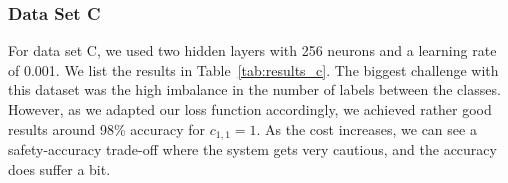 \documentclass[acmsmall,nonacm]{acmart}
\begin{document}
\subsubsection*{Data Set C}
For data set C, we used two hidden layers with 256 neurons and a learning rate of 0.001. We list the results in Table~\ref{tab:results_c}. The biggest challenge with this dataset was the high imbalance in the number of labels between the classes. However, as we adapted our loss function accordingly, we achieved rather good results around 98\% accuracy for $c_{1, 1} = 1$. As the cost increases, we can see a safety-accuracy trade-off where the system gets very cautious, and the accuracy does suffer a bit.

\begin{table}[H]
\end{table}
\end{document}
